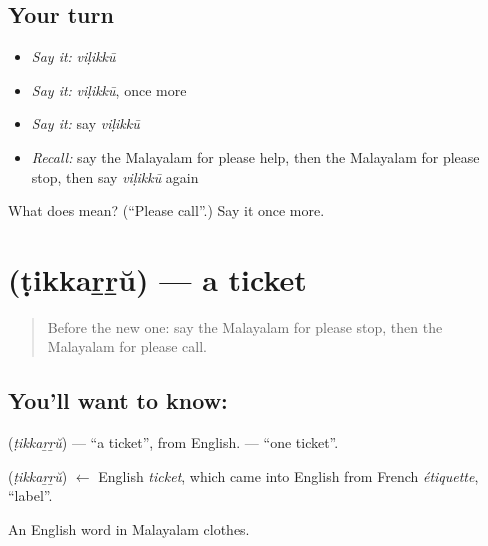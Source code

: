 \subsection*{Your turn}
\begin{itemize}
\raggedright
  \item \emph{Say it:} \emph{viḷikkū}
  \item \emph{Say it:} \emph{viḷikkū}, once more
  \item \emph{Say it:} say \emph{viḷikkū}
  \item \emph{Recall:} say the Malayalam for please help, then the Malayalam for please stop, then say \emph{viḷikkū} again
\end{itemize}

\begin{tcolorbox}[breakable,colback=teal!4,colframe=teal!35!black,title={Before you move on}]
What does  mean? (\textquotedblleft{}Please call\textquotedblright{}.) Say it once more.
\end{tcolorbox}
\section[\texorpdfstring{\ml{ടിക്കറ്റ്} (ṭikkaṟṟŭ)}{ടിക്കറ്റ് (ṭikkaṟṟŭ)}]{ (ṭikkaṟṟŭ) — a ticket}

\label{lesson:ML-C121-ticket}



\begin{quote}
Before the new one: say the Malayalam for please stop, then the Malayalam for please call.
\end{quote}

\subsection*{You'll want to know: }
\textbf{} (\emph{ṭikkaṟṟŭ}) — \textquotedblleft{}a ticket\textquotedblright{}, from English. \textbf{ } — \textquotedblleft{}one ticket\textquotedblright{}.

\begin{cousinweb}
\textbf{} (\emph{ṭikkaṟṟŭ}) $\leftarrow$ English \emph{ticket}, which came into English from French \emph{étiquette}, \textquotedblleft{}label\textquotedblright{}.
\end{cousinweb}

\begin{grammarlens}[title={What you've built}]
An English word in Malayalam clothes.
\end{grammarlens}

